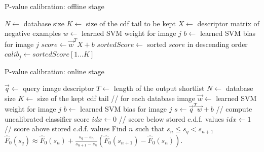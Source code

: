  
 
      \begin{algorithm}
         \caption{P-value calibration: offline stage}\label{alg:offline}
         \begin{algorithmic}[1]
         \State $N \gets$ database size
         \State $K \gets$ size of the cdf tail to be kept
         \State $X \gets$ descriptor matrix of negative examples %
            \State $w \gets$ learned SVM weight for image $j$
            \State $b \gets$ learned SVM bias for image $j$
            \State $score \gets \vec{w}^TX+b$
            \State $sortedScore \gets$ sorted $score$ in descending order
            \State $calib_j \gets sortedScore[1\dots K]$
         \EndFor
         \EndProcedure
         \end{algorithmic}
         \label{alg:onffline}
      \end{algorithm}

       \begin{algorithm}
         \caption{P-value calibration: online stage}\label{alg:online}
         \begin{algorithmic}[1]
         \State $\vec{q} \gets$ query image descriptor
         \State $T \gets$ length of the output shortlist
         \State $N \gets$ database size
         \State $K \gets$ size of the kept cdf tail
          // for each database image
            \State $\vec{w} \gets$ learned SVM weight for image $j$
            \State $b \gets$ learned SVM bias for image $j$
            \State $s \gets \vec{q}^T\vec{w}+b$  // compute uncalibrated classifier score
               \State $idx \gets 0$ \hspace{10mm} // score below stored c.d.f. values
               \State $idx \gets 1$ \hspace{9mm} // score above stored c.d.f. values 
            \Else
  		\State Find $n$ such that $s_{n} \leq s_q < s_{n+1} $
		\State 
         $
         \hat{F}_0(s_q)\approx 
         \hat{F}_0(s_n)+\frac{s_q-s_n}{s_{n+1}-s_n} (\hat{F}_0(s_{n+1})-\hat{F}_0(s_n)).
        $\\
            \EndIf         
         \EndFor
         \EndProcedure
         \end{algorithmic}
         \label{alg:online}
      \end{algorithm}
      
